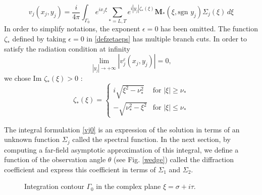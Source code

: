 \begin{equation}
v_j(x_j,y_j)=\frac{i}{4\pi}\int_{\Gamma_0} e^{ix_j\xi}\sum_{*=L,T}e^{i|y_j|\zeta_*(\xi)}\mathbf{M_*}(\xi,\mbox{sgn }y_j)\Sigma_j(\xi)\,d\xi
\label{vj0}
\end{equation}
In order to simplify notations, the exponent $\epsilon=0$ has been omitted.
The function $\zeta_*$ defined by taking $\epsilon=0$ in \eqref{defzetaeps} has multiple branch cuts. In order to satisfy the radiation condition at infinity
\begin{equation}
\lim\limits_{|y_j| \rightarrow +\infty} |v_j^{\varepsilon}(x_j,y_j)|=0,
\label{CR}
\end{equation}
we chose Im $\zeta_*(\xi)>0$ :
\begin{equation}
\zeta_*(\xi)=
\left\{
\begin{matrix}
i\sqrt{\xi^2-\nu_*^2}& \mbox{for } |\xi| \geq \nu_* \\
-\sqrt{\nu_*^2-\xi^2}& \mbox{for } |\xi| \leq \nu_*
\end{matrix}
\right.
\label{defzeta}
\end{equation}

The integral formulation \eqref{vj0} is an expression of the solution in terms of an unknown function $\Sigma_j$ called the spectral function. In the next section, by computing a far-field asymptotic approximation of this integral, we define a function of the observation angle $\theta$ (see Fig. \ref{wedge}) called the diffraction coefficient and express this coefficient in terms of $\Sigma_1$ and $\Sigma_2$.

\begin{figure}[h]
\centering
{}
\caption{Integration contour $\Gamma_0$ in the complex plane $\xi=\sigma+i\tau$.}
\label{gamma0}
\end{figure}

